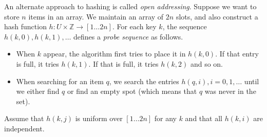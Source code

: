 \documentclass[addpoints]{exam}
\begin{document}
\begin{questions}
An alternate approach to hashing is called \emph{open addressing}. Suppose we
want to store $n$ items in an array. We maintain an array of $2n$ slots, and
also construct a hash function $h : U \times {\mathbb Z} \rightarrow [1\ldots
2n]$. For each key $k$, the sequence $h(k, 0), h(k, 1), \ldots$ defines a
\emph{probe sequence} as follows. 

\begin{itemize}
\item When $k$ appear, the algorithm first tries to place it in $h(k,0)$. If
  that entry is full, it tries $h(k, 1)$. If that is full, it tries $h(k, 2)$
  and so on.

\item   When searching for an item $q$, we search the entries
  $h(q, i), i = 0, 1, \ldots$ until we either find $q$ or find an empty spot
  (which means that $q$ was never in the set).
\end{itemize}

Assume that $h(k, j)$ is uniform over $[1\ldots 2n]$ for any $k$ and that all
$h(k, i)$ are independent. 



\end{questions}
\end{document}
